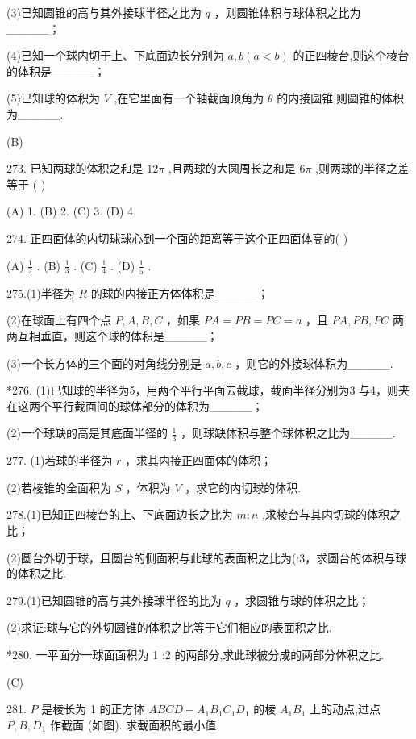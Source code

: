 \documentclass[10pt]{article}
\begin{document}
(3)已知圆锥的高与其外接球半径之比为 \(q\) ，则圆锥体积与球体积之比为\_\_\_\_\_；

(4)已知一个球内切于上、下底面边长分别为 \(a,b\left( {a < b}\right)\) 的正四棱台,则这个棱台的体积是\_\_\_\_\_；

(5)已知球的体积为 \(V\) ,在它里面有一个轴截面顶角为 \(\theta\) 的内接圆锥,则圆锥的体积为\_\_\_\_\_.

(B)

273. 已知两球的体积之和是 \({12\pi }\) ,且两球的大圆周长之和是 \({6\pi }\) ,则两球的半径之差等于 ( )

(A) 1. (B) 2. (C) 3. (D) 4.

274. 正四面体的内切球球心到一个面的距离等于这个正四面体高的( )

(A) \(\frac{1}{2}\) . (B) \(\frac{1}{3}\) . (C) \(\frac{1}{4}\) . (D) \(\frac{1}{5}\) .

275.(1)半径为 \(R\) 的球的内接正方体体积是\_\_\_\_\_；

(2)在球面上有四个点 \(P,A,B,C\) ，如果 \({PA} = {PB} = {PC} = a\) ，且 \({PA},{PB},{PC}\) 两两互相垂直，则这个球的体积是\_\_\_\_\_；

(3)一个长方体的三个面的对角线分别是 \(a,b,c\) ，则它的外接球体积为\_\_\_\_\_.

*276. (1)已知球的半径为5，用两个平行平面去截球，截面半径分别为3 与4，则夹在这两个平行截面间的球体部分的体积为\_\_\_\_\_；

(2)一个球缺的高是其底面半径的 \(\frac{1}{3}\) ，则球缺体积与整个球体积之比为\_\_\_\_\_.

277. (1)若球的半径为 \(r\) ，求其内接正四面体的体积；

(2)若棱锥的全面积为 \(S\) ，体积为 \(V\) ，求它的内切球的体积.

278.(1)已知正四棱台的上、下底面边长之比为 \(m : n\) ,求棱台与其内切球的体积之比；

(2)圆台外切于球，且圆台的侧面积与此球的表面积之比为(:3，求圆台的体积与球的体积之比.

279.(1)已知圆锥的高与其外接球半径的比为 \(q\) ，求圆锥与球的体积之比；

(2)求证:球与它的外切圆锥的体积之比等于它们相应的表面积之比.

*280. 一平面分一球面面积为 1 :2 的两部分,求此球被分成的两部分体积之比.

(C)

281. \(P\) 是棱长为 1 的正方体 \({ABCD} - {A}_{1}{B}_{1}{C}_{1}{D}_{1}\) 的棱 \({A}_{1}{B}_{1}\) 上的动点,过点 \(P,B,{D}_{1}\) 作截面 (如图). 求截面积的最小值.
\end{document}

